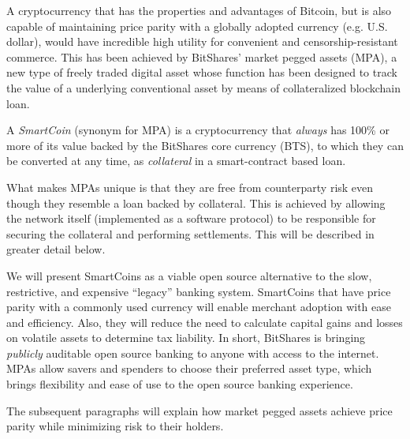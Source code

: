 \label{sec:mpa}

A cryptocurrency that has the properties and advantages of Bitcoin, but is also
capable of maintaining price parity with a globally adopted currency (e.g.
U.S. dollar), would have incredible high utility for convenient and
censorship-resistant commerce. This has been achieved by BitShares' market
pegged assets (MPA), a new type of freely traded digital asset whose function
has been designed to track the value of a underlying conventional asset by
means of collateralized blockchain loan.

A \emph{SmartCoin} (synonym for MPA) is a cryptocurrency that \emph{always} has
100\% or more of its value backed by the BitShares core currency (BTS), to
which they can be converted at any time, as \emph{collateral} in a
smart-contract based loan.

What makes MPAs unique is that they are free from counterparty risk even though
they resemble a loan backed by collateral. This is achieved by allowing the
network itself (implemented as a software protocol) to be responsible for
securing the collateral and performing settlements. This will be described in
greater detail below.


We will present SmartCoins as a viable open source alternative to the slow,
restrictive, and expensive ``legacy'' banking system.  SmartCoins that have
price parity with a commonly used currency will enable merchant adoption with
ease and efficiency. Also, they will reduce the need to calculate capital gains
and losses on volatile assets to determine tax liability. In short, BitShares
is bringing \emph{publicly} auditable open source banking to anyone with access
to the internet. MPAs allow savers and spenders to choose their preferred asset
type, which brings flexibility and ease of use to the open source banking
experience.

The subsequent paragraphs will explain how market pegged assets achieve price
parity while minimizing risk to their holders.
